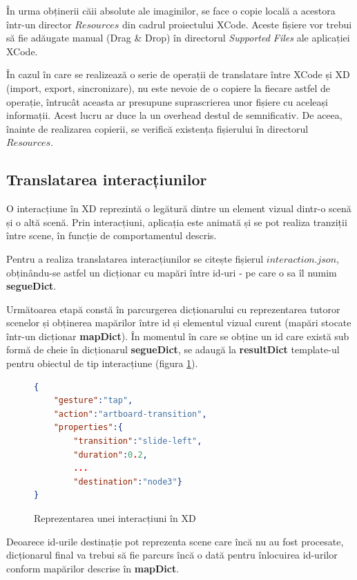 În urma obținerii căii absolute ale imaginilor, se face o copie locală a acestora într-un director $Resources$ din cadrul proiectului XCode. Aceste fișiere vor trebui să fie adăugate manual (Drag \& Drop) în directorul \textit{Supported Files} ale aplicației XCode.

În cazul în care se realizează o serie de operații de translatare între XCode și XD (import, export, sincronizare), nu este nevoie de o copiere la fiecare astfel de operație, întrucât aceasta ar presupune suprascrierea unor fișiere cu aceleași informații. Acest lucru ar duce la un overhead destul de semnificativ. De aceea, înainte de realizarea copierii, se verifică existența fișierului în directorul $Resources$.

\subsection{Translatarea interacțiunilor}

O interacțiune în XD reprezintă o legătură dintre un element vizual dintr-o scenă și o altă scenă. Prin interacțiuni, aplicația este animată și se pot realiza tranziții între scene, în funcție de comportamentul descris. 

Pentru a realiza translatarea interacțiunilor se citește fișierul $interaction.json$, obținându-se astfel un dicționar cu mapări între id-uri - pe care o sa îl numim \textbf{segueDict}. 

Următoarea etapă constă în parcurgerea dicționarului cu reprezentarea tutoror scenelor și obținerea mapărilor între id și elementul vizual curent (mapări stocate într-un dicționar \textbf{mapDict}). În momentul în care se obține un id care există sub formă de cheie în dicționarul \textbf{segueDict}, se adaugă la \textbf{resultDict} template-ul pentru obiectul de tip interacțiune (figura \ref{fig:interactXD}).

\begin{figure}[!htbp]
\begin{lstlisting}[language=json,firstnumber=1]
{
    "gesture":"tap",
    "action":"artboard-transition",
    "properties":{
        "transition":"slide-left",
        "duration":0.2,
        ...
        "destination":"node3"}
} 
\end{lstlisting}
\caption{Reprezentarea unei interacțiuni în XD} \label{fig:interactXD}
\end{figure}

Deoarece id-urile destinație pot reprezenta scene care încă nu au fost procesate, dicționarul final va trebui să fie parcurs încă o dată pentru înlocuirea id-urilor conform mapărilor descrise în \textbf{mapDict}.

